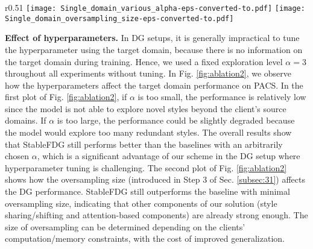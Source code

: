 \documentclass{article}
\theoremstyle{plain}
\theoremstyle{definition}
\theoremstyle{remark}
\begin{document}
 

 

\begin{wrapfigure}{r}{0.51\textwidth}
   \vspace{-4mm}
  \centering
  \texttt{[image: Single\_domain\_various\_alpha-eps-converted-to.pdf]}
\texttt{[image: Single\_domain\_oversampling\_size-eps-converted-to.pdf]}
  \vspace{-4mm}
  \caption{ Effects of exploration level $\alpha$ (left) and oversampling size (right) in StableFDG.}
  \label{fig:ablation2}
  \vspace{-3mm}
\end{wrapfigure}


\textbf{Effect of hyperparameters.}  In DG setups, it is generally impractical to tune the hyperparameter using the target domain, because there is no information on the target domain during training.  Hence, we used a fixed exploration level $\alpha=3$     throughout all experiments without tuning.   In  Fig. \ref{fig:ablation2},  we observe how the hyperparameters affect the target domain performance on PACS. In the first plot of Fig. \ref{fig:ablation2}, if $\alpha$ is too small, the performance is relatively low   since
  the model is not able to explore novel styles
 beyond the client’s source domains.  If $\alpha$ is too large, the performance could be slightly degraded because the model would explore too many redundant styles.  The overall results show that StableFDG still performs better than the baselines with an arbitrarily chosen  $\alpha$, which is a significant advantage of our scheme in the DG setup where hyperparameter tuning is challenging. The second plot of Fig. \ref{fig:ablation2} shows how the oversampling size (introduced in Step 3 of Sec. \ref{subsec:31}) affects the DG performance. %
 StableFDG still outperforms the baseline  with minimal oversampling size,
 indicating that other components of our solution (style sharing/shifting and attention-based components) are already strong enough. The size of oversampling can be determined depending on the clients' computation/memory constraints, with the cost of improved generalization.    
\end{document}
